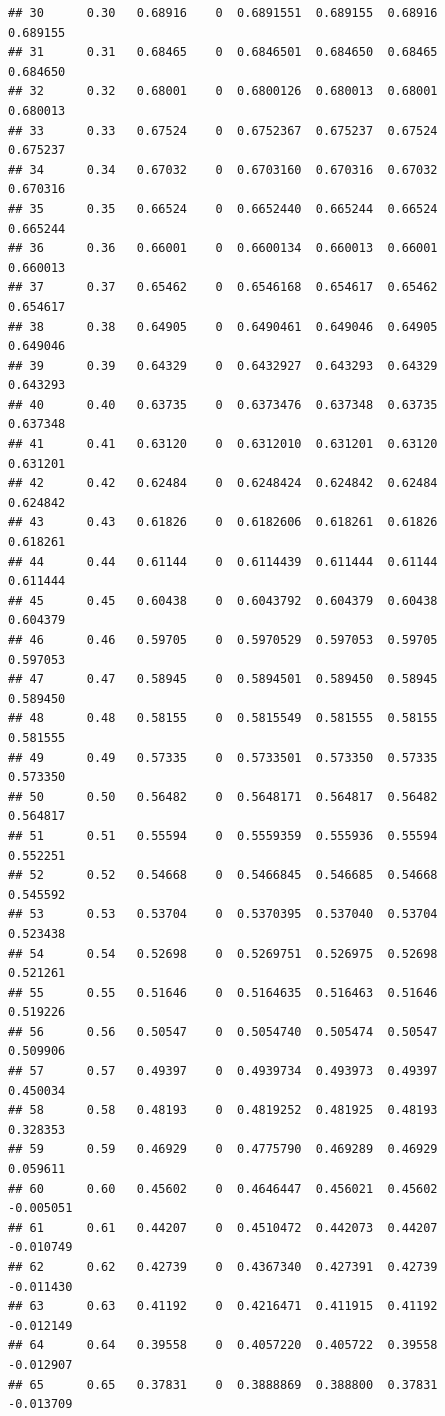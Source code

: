 \documentclass{article}\usepackage[]{graphicx}\usepackage[]{color}
\makeatletter
\newenvironment{kframe}{%
 \def\at@end@of@kframe{}%
 \ifinner\ifhmode%
  \def\at@end@of@kframe{\end{minipage}}%
  \begin{minipage}{\columnwidth}%
 \fi\fi%
 \def\FrameCommand##1{\hskip\@totalleftmargin \hskip-\fboxsep
 \colorbox{shadecolor}{##1}\hskip-\fboxsep
     \hskip-\linewidth \hskip-\@totalleftmargin \hskip\columnwidth}%
 \MakeFramed {\advance\hsize-\width
   \@totalleftmargin\z@ \linewidth\hsize
   \@setminipage}}%
 {\par\unskip\endMakeFramed%
 \at@end@of@kframe}
\newenvironment{knitrout}{}{} %
\makeatother
\begin{document}
\begin{knitrout}
\begin{kframe}
\begin{verbatim}
## 30      0.30   0.68916    0  0.6891551  0.689155  0.68916    0.689155
## 31      0.31   0.68465    0  0.6846501  0.684650  0.68465    0.684650
## 32      0.32   0.68001    0  0.6800126  0.680013  0.68001    0.680013
## 33      0.33   0.67524    0  0.6752367  0.675237  0.67524    0.675237
## 34      0.34   0.67032    0  0.6703160  0.670316  0.67032    0.670316
## 35      0.35   0.66524    0  0.6652440  0.665244  0.66524    0.665244
## 36      0.36   0.66001    0  0.6600134  0.660013  0.66001    0.660013
## 37      0.37   0.65462    0  0.6546168  0.654617  0.65462    0.654617
## 38      0.38   0.64905    0  0.6490461  0.649046  0.64905    0.649046
## 39      0.39   0.64329    0  0.6432927  0.643293  0.64329    0.643293
## 40      0.40   0.63735    0  0.6373476  0.637348  0.63735    0.637348
## 41      0.41   0.63120    0  0.6312010  0.631201  0.63120    0.631201
## 42      0.42   0.62484    0  0.6248424  0.624842  0.62484    0.624842
## 43      0.43   0.61826    0  0.6182606  0.618261  0.61826    0.618261
## 44      0.44   0.61144    0  0.6114439  0.611444  0.61144    0.611444
## 45      0.45   0.60438    0  0.6043792  0.604379  0.60438    0.604379
## 46      0.46   0.59705    0  0.5970529  0.597053  0.59705    0.597053
## 47      0.47   0.58945    0  0.5894501  0.589450  0.58945    0.589450
## 48      0.48   0.58155    0  0.5815549  0.581555  0.58155    0.581555
## 49      0.49   0.57335    0  0.5733501  0.573350  0.57335    0.573350
## 50      0.50   0.56482    0  0.5648171  0.564817  0.56482    0.564817
## 51      0.51   0.55594    0  0.5559359  0.555936  0.55594    0.552251
## 52      0.52   0.54668    0  0.5466845  0.546685  0.54668    0.545592
## 53      0.53   0.53704    0  0.5370395  0.537040  0.53704    0.523438
## 54      0.54   0.52698    0  0.5269751  0.526975  0.52698    0.521261
## 55      0.55   0.51646    0  0.5164635  0.516463  0.51646    0.519226
## 56      0.56   0.50547    0  0.5054740  0.505474  0.50547    0.509906
## 57      0.57   0.49397    0  0.4939734  0.493973  0.49397    0.450034
## 58      0.58   0.48193    0  0.4819252  0.481925  0.48193    0.328353
## 59      0.59   0.46929    0  0.4775790  0.469289  0.46929    0.059611
## 60      0.60   0.45602    0  0.4646447  0.456021  0.45602   -0.005051
## 61      0.61   0.44207    0  0.4510472  0.442073  0.44207   -0.010749
## 62      0.62   0.42739    0  0.4367340  0.427391  0.42739   -0.011430
## 63      0.63   0.41192    0  0.4216471  0.411915  0.41192   -0.012149
## 64      0.64   0.39558    0  0.4057220  0.405722  0.39558   -0.012907
## 65      0.65   0.37831    0  0.3888869  0.388800  0.37831   -0.013709

\end{verbatim}
\end{kframe}
\end{knitrout}
\end{document}
